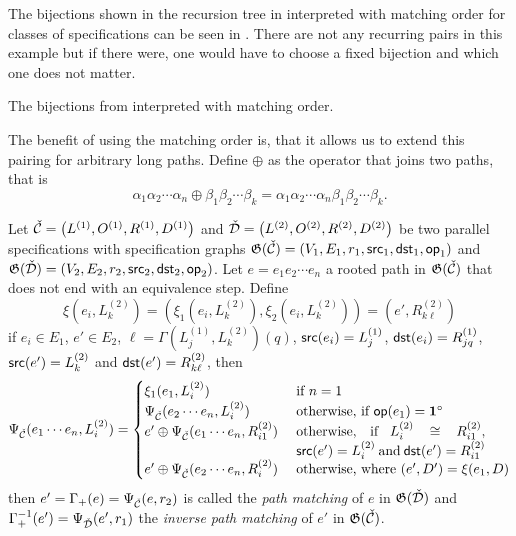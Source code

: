 The bijections shown in the recursion tree in  interpreted with matching order for classes of specifications can be seen in . There are not any recurring pairs in this example but if there were, one would have to choose a fixed bijection and which one does not matter. 

\begin{table}[ht!]
    \centering
    
    \caption{The bijections from  interpreted with matching order.}
    \label{tab:corrmatch}
\end{table}

The benefit of using the matching order is, that it allows us to extend this pairing for arbitrary long paths. Define $\oplus$ as the operator that joins two paths, that is
\[
    \alpha_1\alpha_2 \dotsm \alpha_n \oplus \beta_1\beta_2 \dotsm \beta_k = \alpha_1\alpha_2 \dotsm \alpha_n\beta_1\beta_2 \dotsm \beta_k.
\]

\begin{definition}\label{def:pathmatch}
Let $\check{\mathcal{C}} = \left(L^{(1)}, O^{(1)}, R^{(1)}, D^{(1)}\right)$ and $\check{\mathcal{D}} = \left(L^{(2)}, O^{(2)}, R^{(2)}, D^{(2)}\right)$ be two parallel specifications with specification graphs $\mathfrak{G}(\check{\mathcal{C}})=(V_1,E_1,r_1,\textsf{src}_1,\textsf{dst}_1,\textsf{op}_1)$ and $\mathfrak{G}(\check{\mathcal{D}})=(V_2,E_2,r_2,\textsf{src}_2,\textsf{dst}_2,\textsf{op}_2)$. Let $e=e_1e_2\dotsm e_n$ a rooted path in $\mathfrak{G}(\check{\mathcal{C}})$ that does not end with an equivalence step. Define
\[
    \xi\left(e_i,L^{(2)}_k\right)  = \left(\xi_1\left(e_i,L^{(2)}_k\right),\xi_2\left(e_i,L^{(2)}_k\right)\right) = \left(e',R^{(2)}_{k\ell}\right)  
\]
if $e_i \in E_1$, $e' \in E_2$, $\ell = \Gamma(L^{(1)}_j,L^{(2)}_k)(q)$, $\textsf{src}(e_i) = L^{(1)}_j$, $\textsf{dst}(e_i) = R^{(1)}_{jq}$, $\textsf{src}(e') = L^{(2)}_k$ and $\textsf{dst}(e') = R^{(2)}_{k\ell}$, then
\[
    \Psi_{\spec{C}}(e_1\cdots e_n, L^{(2)}_i) =
    \begin{cases}
        \xi_1(e_1,L^{(2)}_i) & \text{ if $n=1$}\\
        \Psi_{\spec{C}}(e_2 \cdots e_n,L^{(2)}_i) & \text{ otherwise, if $\op(e_1) = \mathbf{1}^\circ$}\\
        e' \oplus \Psi_{\spec{C}}(e_1 \cdots e_n, R^{(2)}_{i1}) & \text{ }\parbox[t]{.4\textwidth}{otherwise, if $L^{(2)}_i \cong R^{(2)}_{i1}$, $\src(e') = L^{(2)}_i$ and $\dst(e') = R^{(2)}_{i1}$}\\
        e' \oplus \Psi_{\spec{C}}(e_2\dotsm e_n, R^{(2)}_{i}) & \text{ otherwise, where } (e',D') = \xi(e_1,D)
    \end{cases}
\]
then $e' = \Gamma_+(e) = \Psi_{\check{\mathcal{C}}}(e,r_2)$ is called the \emph{path matching} of $e$ in $\mathfrak{G}(\check{\mathcal{D}})$ and $\Gamma^{-1}_+(e') = \Psi_{\check{\mathcal{D}}}(e',r_1)$ the \emph{inverse path matching} of $e'$ in $\mathfrak{G}(\check{\mathcal{C}})$.
\end{definition}

